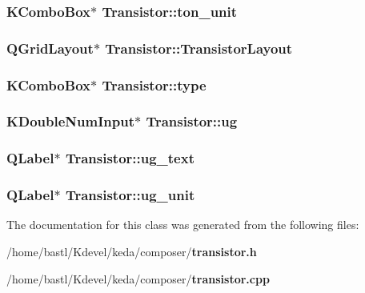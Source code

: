 \subsubsection{\setlength{\rightskip}{0pt plus 5cm}KCombo\-Box$\ast$ {\bf Transistor::ton\_\-unit}}\label{classTransistor_13d516d84e869693f50682276fc189c2}


\subsubsection{\setlength{\rightskip}{0pt plus 5cm}QGrid\-Layout$\ast$ {\bf Transistor::Transistor\-Layout}\hspace{0.3cm}{\tt  [protected]}}\label{classTransistor_72d52f4007b2f71a435f4dc18cad1120}


\subsubsection{\setlength{\rightskip}{0pt plus 5cm}KCombo\-Box$\ast$ {\bf Transistor::type}}\label{classTransistor_599dcce2998a6b40b1e38e8c6006cb0a}


\subsubsection{\setlength{\rightskip}{0pt plus 5cm}KDouble\-Num\-Input$\ast$ {\bf Transistor::ug}}\label{classTransistor_2a0617accf8bb8625c43e2ffeb5b8d5b}


\subsubsection{\setlength{\rightskip}{0pt plus 5cm}QLabel$\ast$ {\bf Transistor::ug\_\-text}}\label{classTransistor_aae76fb81b7dd9c66a16004116527425}


\subsubsection{\setlength{\rightskip}{0pt plus 5cm}QLabel$\ast$ {\bf Transistor::ug\_\-unit}}\label{classTransistor_38663ef46b23e4dd4c01c156b2b32f1f}




The documentation for this class was generated from the following files:\begin{CompactItemize}
\item 
/home/bastl/Kdevel/keda/composer/{\bf transistor.h}\item 
/home/bastl/Kdevel/keda/composer/{\bf transistor.cpp}\end{CompactItemize}
